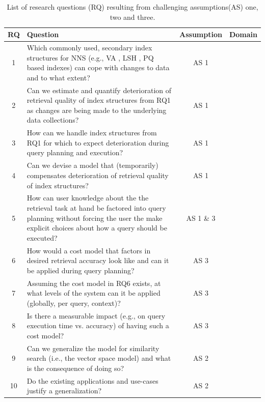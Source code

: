 \begin{table}[h!]
    \centering
    \caption{List of research questions (RQ) resulting from challenging assumptions(AS) one, two and three.}
    \begin{tabular}{|c|p{10cm}|c|c|} 
     \hline
     \textbf{RQ} & \textbf{Question} & \textbf{Assumption} & \textbf{Domain} \\ [0.5ex] 
     \hline\hline
     1 & Which commonly used, secondary index structures for NNS (e.g., VA \cite{Weber:1998Va}, LSH \cite{Indyk1998:Approximate}, PQ \cite{Jegou:2010Product} based indexes) can cope with changes to data and to what extent? & AS 1 &\\ 
     2 & Can we estimate and quantify deterioration of retrieval quality of index structures from RQ1 as changes are being made to the underlying data collections? & AS 1 & \\ 
     3 & How can we handle index structures from RQ1 for which to expect deterioration during query planning and execution? & AS 1 & \\
     4 & Can we devise a model that (temporarily) compensates deterioration of retrieval quality of index structures? & AS 1 & \\
     5 & How can user knowledge about the the retrieval task at hand be factored into query planning without forcing the user the make explicit choices about how a query should be executed? & AS 1 \& 3 & \\
     6 & How would a cost model that factors in desired retrieval accuracy look like and can it be applied during query planning? & AS 3 & \\ 
     7 & Assuming the cost model in RQ6 exists, at what levels of the system can it be applied (globally, per query, context)? & AS 3 & \\ 
     8 & Is there a measurable impact (e.g., on query execution time vs. accuracy) of having such a cost model? & AS 3 & \\ 
     9 & Can we generalize the model for similarity search (i.e., the vector space model) and what is the consequence of doing so? & AS 2 & \\ 
     10 & Do the existing applications and use-cases justify a generalization? & AS 2 & \\ 
     \hline
    \end{tabular}
    \label{table:research_questions}
\end{table}


